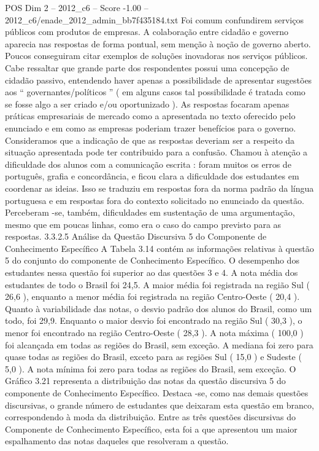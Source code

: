 \begin{textsample}{POS Dim 2 – 2012\_c6 – Score -1.00 – 2012\_c6/enade\_2012\_admin\_bb7f435184.txt}
Foi comum confundirem serviços públicos com produtos de empresas.
A colaboração entre cidadão e governo aparecia nas respostas de forma pontual, sem menção à noção de governo aberto.
Poucos conseguiram citar exemplos de soluções inovadoras nos serviços públicos.
Cabe ressaltar que grande parte dos respondentes possui uma concepção de cidadão passivo, entendendo haver apenas a possibilidade de apresentar sugestões aos “ governantes/políticos ” ( em alguns casos tal possibilidade é tratada como se fosse algo a ser criado e/ou oportunizado ).
As respostas focaram apenas práticas empresariais de mercado como a apresentada no texto oferecido pelo enunciado e em como as empresas poderiam trazer benefícios para o governo.
Consideramos que a indicação de que as respostas deveriam ser a respeito da situação apresentada pode ter contribuido para a confusão.
Chamou à atenção a dificuldade dos alunos com a comunicação escrita : foram muitos os erros de português, grafia e concordância, e ficou clara a dificuldade dos estudantes em coordenar as ideias.
Isso se traduziu em respostas fora da norma padrão da língua portuguesa e em respostas fora do contexto solicitado no enunciado da questão.
Perceberam -se, também, dificuldades em sustentação de uma argumentação, mesmo que em poucas linhas, como era o caso do campo previsto para as respostas. 3.3.2.5 Análise da Questão Discursiva 5 do Componente de Conhecimento Específico A Tabela 3.14 contém as informações relativas à questão 5 do conjunto do componente de Conhecimento Específico.
O desempenho dos estudantes nessa questão foi superior ao das questões 3 e 4.
A nota média dos estudantes de todo o Brasil foi 24,5.
A maior média foi registrada na região Sul ( 26,6 ), enquanto a menor média foi registrada na região Centro-Oeste ( 20,4 ).
Quanto à variabilidade das notas, o desvio padrão dos alunos do Brasil, como um todo, foi 29,9.
Enquanto o maior desvio foi encontrado na região Sul ( 30,3 ), o menor foi encontrado na região Centro-Oeste ( 28,3 ).
A nota máxima ( 100,0 ) foi alcançada em todas as regiões do Brasil, sem exceção.
A mediana foi zero para quase todas as regiões do Brasil, exceto para as regiões Sul ( 15,0 ) e Sudeste ( 5,0 ).
A nota mínima foi zero para todas as regiões do Brasil, sem exceção.
O Gráfico 3.21 representa a distribuição das notas da questão discursiva 5 do componente de Conhecimento Específico.
Destaca -se, como nas demais questões discursivas, o grande número de estudantes que deixaram esta questão em branco, correspondendo à moda da distribuição.
Entre as três questões discursivas do Componente de Conhecimento Específico, esta foi a que apresentou um maior espalhamento das notas daqueles que resolveram a questão.

\end{textsample}
